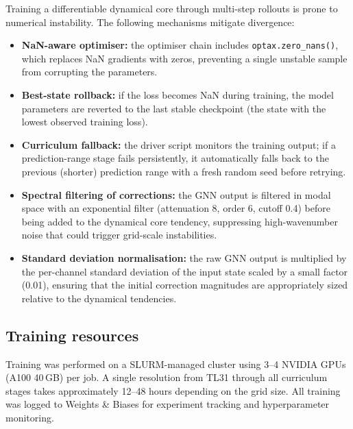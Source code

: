 Training a differentiable dynamical core through multi-step rollouts is prone to numerical instability.
The following mechanisms mitigate divergence:
\begin{itemize}
    \item \textbf{NaN-aware optimiser:} the optimiser chain includes \texttt{optax.zero\_nans()}, which replaces NaN gradients with zeros, preventing a single unstable sample from corrupting the parameters.
    \item \textbf{Best-state rollback:} if the loss becomes NaN during training, the model parameters are reverted to the last stable checkpoint (the state with the lowest observed training loss).
    \item \textbf{Curriculum fallback:} the driver script monitors the training output; if a prediction-range stage fails persistently, it automatically falls back to the previous (shorter) prediction range with a fresh random seed before retrying.
    \item \textbf{Spectral filtering of corrections:} the GNN output is filtered in modal space with an exponential filter (attenuation 8, order 6, cutoff 0.4) before being added to the dynamical core tendency, suppressing high-wavenumber noise that could trigger grid-scale instabilities.
    \item \textbf{Standard deviation normalisation:} the raw GNN output is multiplied by the per-channel standard deviation of the input state scaled by a small factor (0.01), ensuring that the initial correction magnitudes are appropriately sized relative to the dynamical tendencies.
\end{itemize}

\subsection{Training resources}

Training was performed on a SLURM-managed cluster using 3--4 NVIDIA GPUs (A100 40\,GB) per job.
A single resolution from TL31 through all curriculum stages takes approximately 12--48 hours depending on the grid size.
All training was logged to Weights \& Biases for experiment tracking and hyperparameter monitoring.
